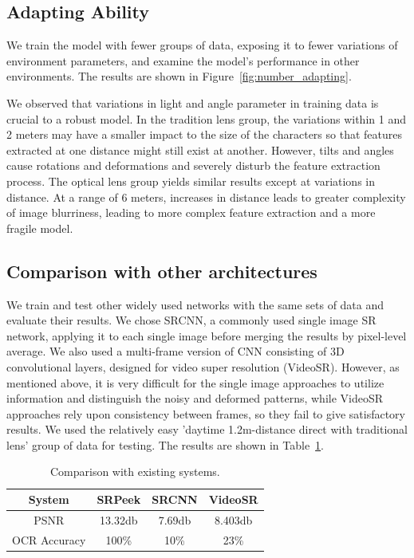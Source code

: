 \subsection{Adapting Ability}
We train the model with fewer groups of data, exposing it to fewer variations of environment parameters, and examine the model's performance in other environments. The results are shown in Figure~\ref{fig:number_adapting}.

We observed that variations in light and angle parameter in training data is crucial to a robust model. In the tradition lens group, the variations within 1 and 2 meters may have a smaller impact to the size of the characters
 so that features extracted at one distance might still exist at another.
 However, tilts and angles cause rotations and deformations and severely disturb the feature extraction process. The optical lens group yields similar results except at variations in distance. At a range of 6 meters, increases in distance leads to greater complexity of image blurriness, leading to more complex feature extraction and a more fragile model.

\subsection{Comparison with other architectures}
We train and test other widely used networks with the same sets of data and evaluate their results. We chose SRCNN, a commonly used single image SR network, applying it to each single image before merging the results by pixel-level average. We also used a multi-frame version of CNN consisting of 3D convolutional layers, designed for video super resolution (VideoSR). However, as mentioned above, it is very difficult for the single image approaches to utilize information and distinguish the noisy and deformed patterns, while VideoSR approaches rely upon consistency between frames, so they fail to give satisfactory results. We used the relatively easy 'daytime 1.2m-distance direct with traditional lens' group of data for testing. The results are shown in Table~\ref{table-comp}.
\begin{table}[!t]
    \centering
    \caption{Comparison with existing systems.}
    \begin{tabular}{@{}cccc@{}}
        \toprule
    System & SRPeek & SRCNN & VideoSR \\ \midrule
    PSNR & 13.32db & 7.69db & 8.403db\\ 
    OCR Accuracy & 100\% & 10\% & 23\%\\ \bottomrule
    \end{tabular}
    \label{table-comp}
\end{table}

